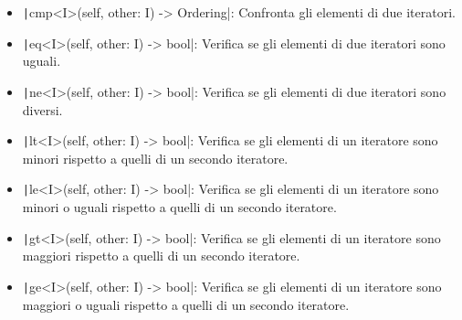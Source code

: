 \begin{itemize}
  \item \texttt|cmp<I>(self, other: I) -> Ordering|: Confronta gli elementi di due iteratori.
  \item \texttt|eq<I>(self, other: I) -> bool|: Verifica se gli elementi di due iteratori sono uguali.
  \item \texttt|ne<I>(self, other: I) -> bool|: Verifica se gli elementi di due iteratori sono diversi.
  \item \texttt|lt<I>(self, other: I) -> bool|: Verifica se gli elementi di un iteratore sono minori rispetto a quelli di un secondo iteratore.
  \item \texttt|le<I>(self, other: I) -> bool|: Verifica se gli elementi di un iteratore sono minori o uguali rispetto a quelli di un secondo iteratore.
  \item \texttt|gt<I>(self, other: I) -> bool|: Verifica se gli elementi di un iteratore sono maggiori rispetto a quelli di un secondo iteratore.
  \item \texttt|ge<I>(self, other: I) -> bool|: Verifica se gli elementi di un iteratore sono maggiori o uguali rispetto a quelli di un secondo iteratore.
\end{itemize}


